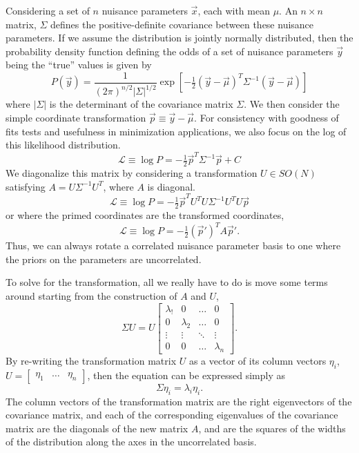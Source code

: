 \documentclass[main.tex]{subfiles}
\begin{document}
Considering a set of $n$ nuisance parameters $\vec{x}$, each with mean $\mu$.
An $n\times n$ matrix, $\Sigma$ defines the positive-definite covariance between these nuisance parameters. 
If we assume the distribution is jointly normally distributed, then the probability density function defining the odds of a set of nuisance parameters $\vec{y}$ being the ``true'' values is given by
\begin{equation}
    P(\vec{y}) = \dfrac{1}{(2\pi)^{n/2}\left|\Sigma\right|^{1/2}}\exp\left[-\tfrac{1}{2}(\vec{y}-\vec{\mu})^{T}\Sigma^{-1}\left(\vec{y}-\vec{\mu}\right)\right]
\end{equation}
where $\left|\Sigma\right|$ is the determinant of the covariance matrix $\Sigma$. 
We then consider the simple coordinate transformation $ \vec{p}\equiv \vec{y}-\vec{\mu}$.
For consistency with goodness of fits tests and usefulness in minimization applications, we also focus on the log of this likelihood distribution. 
\begin{equation}
\mathcal{L} \equiv \log P = -\tfrac{1}{2}\vec{p}^{T}\Sigma^{-1}\vec{p} + C
\end{equation}
We diagonalize this matrix by considering a transformation $U\in SO(N)$ satisfying $A = U\Sigma^{-1}U^{T}$, where $A$ is diagonal. 
\begin{equation}
    \mathcal{L} \equiv \log P = -\tfrac{1}{2}\vec{p}^{T} U^{T} U\Sigma^{-1} U^{T} U\vec{p}
\end{equation}
or where the primed coordinates are the transformed coordinates,
\begin{equation}
    \mathcal{L} \equiv \log P = -\tfrac{1}{2}(\vec{p}')^{T} A \vec{p}'.
\end{equation}
Thus, we can always rotate a correlated nuisance parameter basis to one where the priors on the parameters are uncorrelated. 

To solve for the transformation, all we really have to do is move some terms around starting from the construction of $A$ and $U$, 
\begin{equation} 
    \Sigma U =  U\left[ \begin{array}{cccc}\lambda_{!} & 0 & \ldots & 0 \\
        0 & \lambda_{2} & \ldots & 0 \\
        \vdots & \vdots & \ddots & \vdots \\
        0 & 0 & \ldots & \lambda_{n} \end{array}\right].
\end{equation}
By re-writing the transformation matrix $U$ as a vector of its column vectors $\eta_{i}$, $U=\left[\begin{array}{ccc}\eta_{1} & \ldots & \eta_{n} \end{array}\right]$, then the equation can be expressed simply as 
\begin{equation}
    \Sigma \eta_{i} = \lambda_{i}\eta_{i}.
\end{equation}
The column vectors of the transformation matrix are the right eigenvectors of the covariance matrix, and each of the corresponding eigenvalues of the covariance matrix are the diagonals of the new matrix $A$, and are the squares of the widths of the distribution along the axes in the uncorrelated basis. 
\end{document}

